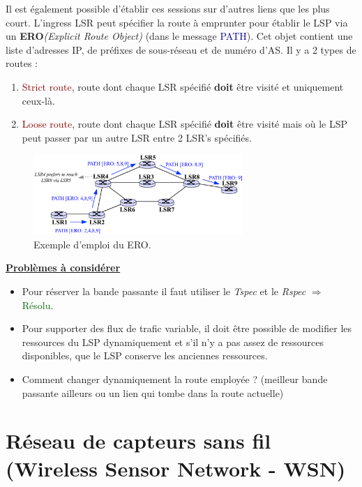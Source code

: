 \documentclass{article}
\newcommand{\gre}[1]{\textcolor{darkgreen}{#1}}
\newcommand{\blu}[1]{\textcolor{darkblue}{#1}}
\newcommand{\rouge}[1]{\textcolor{darkred}{#1}}
\begin{document}
\begin{sffamily}
Il est également possible d'établir ces sessions sur d'autres liens que les plus court. L'ingress LSR peut spécifier la route à
emprunter pour établir le LSP via un \textbf{ERO}\textit{(Explicit Route Object)} (dans le message \blu{PATH}). Cet objet 
contient une liste d'adresses IP, de préfixes de sous-réseau et de numéro d'AS. Il y a 2 types de routes :
\begin{enumerate}
\item \rouge{Strict route}, route dont chaque LSR spécifié \textbf{doit} être visité et uniquement ceux-là.
\item \rouge{Loose route}, route dont chaque LSR spécifié \textbf{doit} être visité mais où le LSP peut passer par un autre
LSR entre 2 LSR's spécifiés.
\end{enumerate}

\begin{figure}[h!]
    \begin{center}
    \includegraphics[width=300px]{img_025.pdf}
    \caption{Exemple d'emploi du ERO.}
    \end{center}	
\end{figure}

\noindent \underline{\textbf{Problèmes à considérer}}\\

\noindent
\begin{itemize}
\item Pour réserver la bande passante il faut utiliser le \textit{Tspec} et le \textit{Rspec} $\Rightarrow$ \gre{Résolu}.
\item Pour supporter des flux de trafic variable, il doit être possible de modifier les ressources du LSP dynamiquement et s'il
n'y a pas assez de ressources disponibles, que le LSP conserve les anciennes ressources.
\item Comment changer dynamiquement la route employée ? (meilleur bande passante ailleurs ou un lien qui tombe dans la route 
actuelle)
\end{itemize}

\section{Réseau de capteurs sans fil (Wireless Sensor Network - WSN)}

\end{sffamily}
\end{document}
